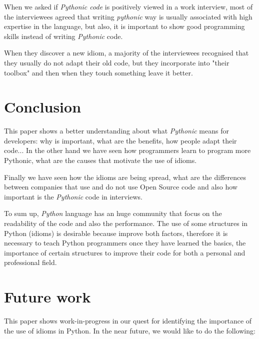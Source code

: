 \documentclass[a4paper]{article}
\begin{document}
When we asked if \textit{Pythonic code} is positively viewed in a work interview, most of the interviewees agreed that writing \textit{pythonic} way is usually associated with high expertise in the language, but also, it is important to show good programming skills instead of writing \textit{Pythonic} code.

When they discover a new idiom, a majority of the interviewees recognised that they usually do not adapt their old code, but they incorporate into "their toolbox" and then when they touch something leave it better.


\section{Conclusion}

This paper shows a better understanding about what \textit{Pythonic} means for developers: why is important, what are the benefits, how people adapt their code... In the other hand we have seen how programmers learn to program more Pythonic, what are the causes that motivate the use of idioms. 

Finally we have seen how the idioms are being spread, what are the differences between companies that use and do not use Open Source code and also how important is the \textit{Pythonic} code in interviews.

To sum up, \textit{Python} language has an huge community that focus on the readability of the code and also the performance. The use of some structures in Python (idioms) is desirable because improve both factors, therefore it is necessary to teach Python programmers once they have learned the basics, the importance of certain structures to improve their code for both a personal and professional field.

\section{Future work}

This paper shows work-in-progress in our quest for identifying the importance of the use of idioms in Python. In the near future, we would like to do the following:
\end{document}
